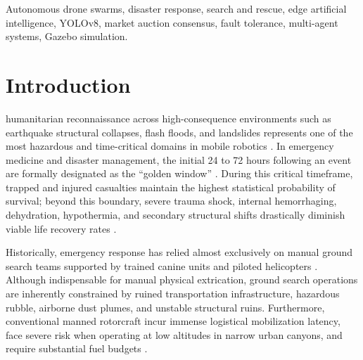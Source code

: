 \documentclass[journal]{IEEEtran}
\begin{document}
\begin{IEEEkeywords}
Autonomous drone swarms, disaster response, search and rescue, edge artificial intelligence, YOLOv8, market auction consensus, fault tolerance, multi-agent systems, Gazebo simulation.
\end{IEEEkeywords}

\section{Introduction}
 humanitarian reconnaissance across high-consequence environments such as earthquake structural collapses, flash floods, and landslides represents one of the most hazardous and time-critical domains in mobile robotics \cite{1}. In emergency medicine and disaster management, the initial 24 to 72 hours following an event are formally designated as the ``golden window'' \cite{4}. During this critical timeframe, trapped and injured casualties maintain the highest statistical probability of survival; beyond this boundary, severe trauma shock, internal hemorrhaging, dehydration, hypothermia, and secondary structural shifts drastically diminish viable life recovery rates \cite{25}.

Historically, emergency response has relied almost exclusively on manual ground search teams supported by trained canine units and piloted helicopters \cite{3}. Although indispensable for manual physical extrication, ground search operations are inherently constrained by ruined transportation infrastructure, hazardous rubble, airborne dust plumes, and unstable structural ruins. Furthermore, conventional manned rotorcraft incur immense logistical mobilization latency, face severe risk when operating at low altitudes in narrow urban canyons, and require substantial fuel budgets \cite{21}.
\end{document}
